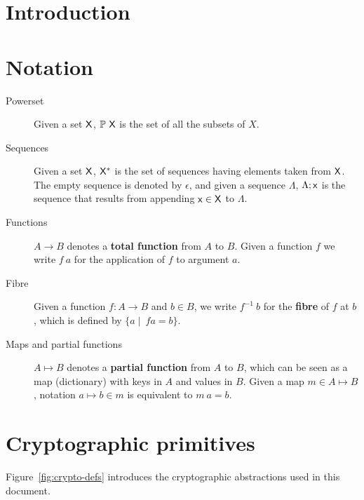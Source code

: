 \documentclass[11pt,a4paper]{article}
\begin{document}


\tableofcontents
\listoffigures

\section{Introduction}
\label{sec:introduction}


\section{Notation}\label{sec:notation}

\begin{description}
\item[Powerset] Given a set $\mathsf{X}$, $\mathbb{P}~\mathsf{X}$ is the set of all
  the subsets of $X$.
\item[Sequences] Given a set $\mathsf{X}$, $\mathsf{X}^{*}$ is the set of
  sequences having elements taken from $\mathsf{X}$. The empty sequence is
  denoted by $\epsilon$, and given a sequence $\Lambda$, $\Lambda; \mathsf{x}$ is
  the sequence that results from appending $\mathsf{x} \in \mathsf{X}$ to
  $\Lambda$.
\item[Functions] $A \to B$ denotes a \textbf{total function} from $A$ to $B$.
  Given a function $f$ we write $f~a$ for the application of $f$ to argument
  $a$.
\item[Fibre] Given a function $f: A \to B$ and $b\in B$, we write
  $f^{-1}~b$ for the \textbf{fibre} of $f$ at $b$, which is defined by
  $\{a \mid\ f a =  b\}$.
\item[Maps and partial functions] $A \mapsto B$ denotes a \textbf{partial
    function} from $A$ to $B$, which can be seen as a map (dictionary) with
  keys in $A$ and values in $B$. Given a map $m \in A \mapsto B$, notation
  $a \mapsto b \in m$ is equivalent to $m~ a = b$.
\end{description}

\section{Cryptographic primitives}
\label{sec:crypto-primitives}

Figure~\ref{fig:crypto-defs} introduces the cryptographic abstractions used in
this document.
\end{document}
